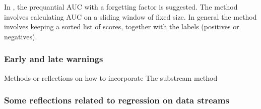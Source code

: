 In \cite{Brz14}, the prequantial AUC with a forgetting factor is suggested.  The method involves calculating AUC on a sliding window of fixed size.  In general the method involves keeping a sorted list of scores, together with the labels (positives or negatives).    



\subsubsection{Early and late warnings}
Methods or reflections on how to incorporate
The substream method

\subsubsection{Some reflections related to regression on data streams}

%
%
%
%





